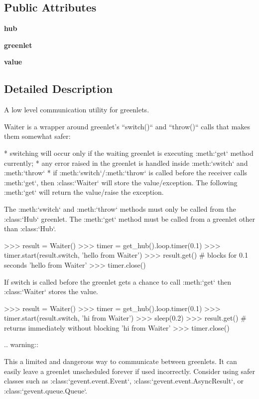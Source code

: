 \subsection*{Public Attributes}
\begin{DoxyCompactItemize}
\item 
\mbox{\label{classgevent_1_1__waiter_1_1_waiter_ad0f985b0fc223a60c94c1c06dccba4d1}} 
{\bfseries hub}
\item 
\mbox{\label{classgevent_1_1__waiter_1_1_waiter_ab4317e5b41ffc2d93573ee5b26128a2d}} 
{\bfseries greenlet}
\item 
\mbox{\label{classgevent_1_1__waiter_1_1_waiter_a3b1539d98bc33c21303cf4578b92a2d8}} 
{\bfseries value}
\end{DoxyCompactItemize}


\subsection{Detailed Description}
\begin{DoxyVerb}A low level communication utility for greenlets.

Waiter is a wrapper around greenlet's ``switch()`` and ``throw()`` calls that makes them somewhat safer:

* switching will occur only if the waiting greenlet is executing :meth:`get` method currently;
* any error raised in the greenlet is handled inside :meth:`switch` and :meth:`throw`
* if :meth:`switch`/:meth:`throw` is called before the receiver calls :meth:`get`, then :class:`Waiter`
  will store the value/exception. The following :meth:`get` will return the value/raise the exception.

The :meth:`switch` and :meth:`throw` methods must only be called from the :class:`Hub` greenlet.
The :meth:`get` method must be called from a greenlet other than :class:`Hub`.

    >>> result = Waiter()
    >>> timer = get_hub().loop.timer(0.1)
    >>> timer.start(result.switch, 'hello from Waiter')
    >>> result.get() # blocks for 0.1 seconds
    'hello from Waiter'
    >>> timer.close()

If switch is called before the greenlet gets a chance to call :meth:`get` then
:class:`Waiter` stores the value.

    >>> result = Waiter()
    >>> timer = get_hub().loop.timer(0.1)
    >>> timer.start(result.switch, 'hi from Waiter')
    >>> sleep(0.2)
    >>> result.get() # returns immediately without blocking
    'hi from Waiter'
    >>> timer.close()

.. warning::

    This a limited and dangerous way to communicate between
    greenlets. It can easily leave a greenlet unscheduled forever
    if used incorrectly. Consider using safer classes such as
    :class:`gevent.event.Event`, :class:`gevent.event.AsyncResult`,
    or :class:`gevent.queue.Queue`.
\end{DoxyVerb}
 

